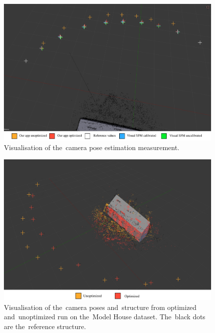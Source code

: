 \begin{figure}[!htbp]
	\begin{center}
		\includegraphics[keepaspectratio,width=\textwidth]{fig/pose_comparison.pdf}
	\end{center}
	\caption{Visualisation of the~camera pose estimation measurement.}
	\label{fig:pose_comparison1}
\end{figure} 
\begin{figure}[!htbp]
	\begin{center}
		\includegraphics[keepaspectratio,width=\textwidth]{fig/pose_comparison2.pdf}
	\end{center}
	\caption{Visualisation of the~camera poses and~structure from optimized and~unoptimized run on the~Model House dataset. The~black dots are the~reference structure.}
	\label{fig:pose_comparison2}
\end{figure} 

